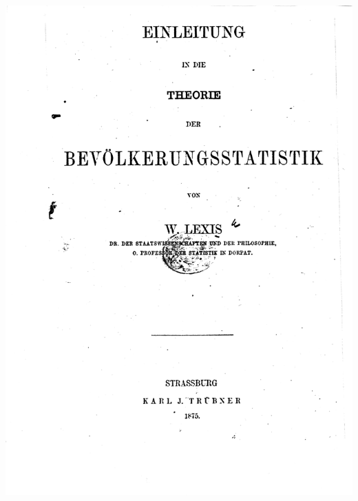 \addtocounter{framenumber}{-1}
\begin{frame}[fragile]
  \begin{minipage}[t]{0.60\textwidth}
    \ \\[-1em]
    \hspace*{-2em}
    \includegraphics[height=1.5\textheight,keepaspectratio]{Lexis-titlepage}
  \end{minipage}
  \begin{minipage}[t]{0.38\textwidth}
    \ \\[-1ex]

\end{minipage}
\end{frame}
